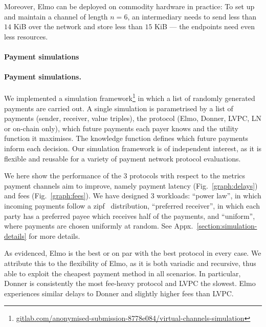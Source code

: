   Moreover, Elmo can be deployed on commodity hardware in practice: To set up
  and maintain a channel of length $n=6$, an intermediary needs to send less
  than $14$ KiB over the network and store less than $15$ KiB --- the endpoints
  need even less resources.

  \makeatletter%
    {\paragraph{Payment simulations}}%
    {\paragraph{Payment simulations.}}%
  \makeatother%
  We implemented a simulation
  framework\footnote{\url{gitlab.com/anonymised-submission-8778e084/virtual-channels-simulation}}
  in which a list of randomly generated payments are carried out.
  A single simulation is parametrised by a list of payments
  (sender, receiver, value triples), the protocol (Elmo, Donner, LVPC, LN or
  on-chain only), which future payments each payer knows and the utility
  function it maximises. The knowledge function defines which future payments
  inform each decision.
  Our simulation framework is of independent interest, as it is flexible
  and reusable for a variety of payment network protocol evaluations.

  We here
  show the performance of the $3$ protocols with respect to the metrics payment
  channels aim to improve, namely payment latency (Fig.~\ref{graph:delays}) and
  fees (Fig.~\ref{graph:fees}). We have designed 3 workloads: ``power law'', in
  which incoming payments follow a zipf~\cite{powers-1998-applications}
  distribution, ``preferred receiver'', in which each party has a preferred
  payee which receives half of the payments, and ``uniform'', where payments are
  chosen uniformly at random. See Appx.~\ref{section:simulation-details} for
  more details.

  As evidenced, Elmo is the best or on par with the best protocol in every
  case. We attribute this to the flexibility of Elmo, as it is both variadic and
  recursive, thus able to exploit the cheapest payment method in all scenarios.
  In particular, Donner is consistently the most fee-heavy protocol and LVPC the
  slowest. Elmo experiences similar delays to Donner and slightly higher fees
  than LVPC.


